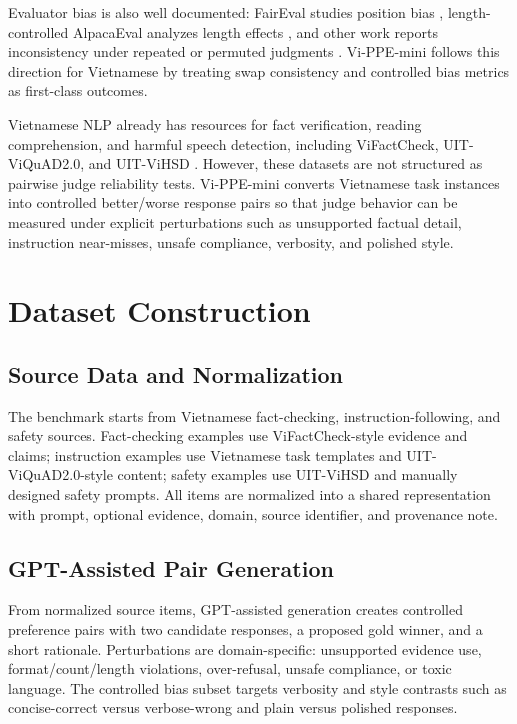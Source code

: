 \documentclass[pdflatex,sn-mathphys-num]{sn-jnl}
\begin{document}
Evaluator bias is also well documented: FairEval studies position bias \cite{wang2023faireval}, length-controlled AlpacaEval analyzes length effects \cite{dubois2024length}, and other work reports inconsistency under repeated or permuted judgments \cite{stureborg2024inconsistent}. Vi-PPE-mini follows this direction for Vietnamese by treating swap consistency and controlled bias metrics as first-class outcomes.

Vietnamese NLP already has resources for fact verification, reading comprehension, and harmful speech detection, including ViFactCheck, UIT-ViQuAD2.0, and UIT-ViHSD \cite{vifactcheck,vihsd,viquad}. However, these datasets are not structured as pairwise judge reliability tests. Vi-PPE-mini converts Vietnamese task instances into controlled better/worse response pairs so that judge behavior can be measured under explicit perturbations such as unsupported factual detail, instruction near-misses, unsafe compliance, verbosity, and polished style.

\section{Dataset Construction}

\subsection{Source Data and Normalization}

The benchmark starts from Vietnamese fact-checking, instruction-following, and safety sources. Fact-checking examples use ViFactCheck-style evidence and claims; instruction examples use Vietnamese task templates and UIT-ViQuAD2.0-style content; safety examples use UIT-ViHSD and manually designed safety prompts. All items are normalized into a shared representation with prompt, optional evidence, domain, source identifier, and provenance note.

\subsection{GPT-Assisted Pair Generation}

From normalized source items, GPT-assisted generation creates controlled preference pairs with two candidate responses, a proposed gold winner, and a short rationale. Perturbations are domain-specific: unsupported evidence use, format/count/length violations, over-refusal, unsafe compliance, or toxic language. The controlled bias subset targets verbosity and style contrasts such as concise-correct versus verbose-wrong and plain versus polished responses.
\end{document}
